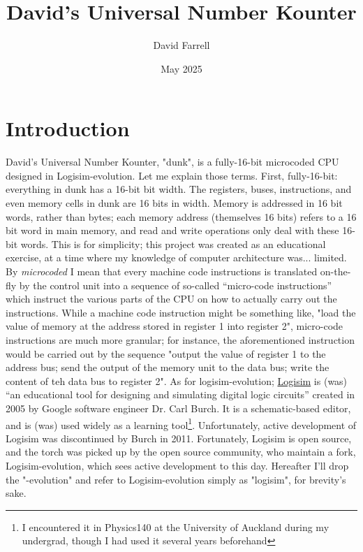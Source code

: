 \documentclass{article}
\title{David's Universal Number Kounter}
\author{David Farrell}
\date{May 2025}
\begin{document}
\maketitle

\section{Introduction}

David's Universal Number Kounter, "dunk", is a fully-16-bit microcoded CPU designed in Logisim-evolution. Let me explain those terms. First, fully-16-bit: everything in dunk has a 16-bit bit width. The registers, buses, instructions, and even memory cells in dunk are 16 bits in width. Memory is addressed in 16 bit words, rather than bytes; each memory address (themselves 16 bits) refers to a 16 bit word in main memory, and read and write operations only deal with these 16-bit words. This is for simplicity; this project was created as an educational exercise, at a time where my knowledge of computer architecture was... limited. By \textit{microcoded} I mean that every machine code instructions is translated on-the-fly by the control unit into a sequence of so-called ``micro-code instructions'' which instruct the various parts of the CPU on how to actually carry out the instructions. While a machine code instruction might be something like, "load the value of memory at the address stored in register 1 into register 2", micro-code instructions are much more granular; for instance, the aforementioned instruction would be carried out by the sequence "output the value of register 1 to the address bus; send the output of the memory unit to the data bus; write the content of teh data bus to register 2". As for logisim-evolution; \href{https://cburch.com/logisim/docs/2.0b17/index.html}{Logisim} is (was) ``an educational tool for designing and simulating digital logic circuits'' created in 2005 by Google software engineer Dr. Carl Burch. It is a schematic-based editor, and is (was) used widely as a learning tool\footnote{I encountered it in Physics140 at the University of Auckland during my undergrad, though I had used it several years beforehand}. Unfortunately, active development of Logisim was discontinued by Burch in 2011. Fortunately, Logisim is open source, and the torch was picked up by the open source community, who maintain a fork, Logisim-evolution, which sees active development to this day. Hereafter I'll drop the "-evolution" and refer to Logisim-evolution simply as "logisim", for brevity's sake. 
\end{document}
